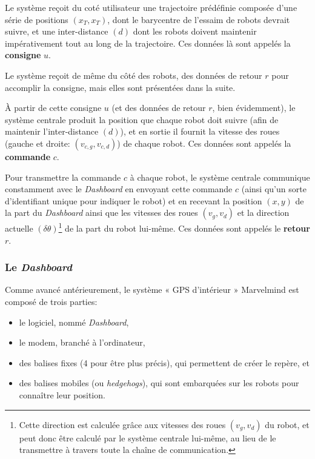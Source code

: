 Le système reçoit du coté utilisateur une trajectoire prédéfinie composée d'une série de positions $(x_T,x_T)$, dont le barycentre de l'essaim de robots devrait suivre, et une inter-distance $(d)$ dont les robots doivent maintenir impérativement tout au long de la trajectoire. Ces données là sont appelés la \textbf{consigne} $u$. 

\noindent Le système reçoit de même du côté des robots, des données de retour $r$ pour accomplir la consigne, mais elles sont présentées dans la suite. 

À partir de cette consigne $u$ (et des données de retour $r$, bien évidemment), le système centrale produit la position que chaque robot doit suivre (afin de maintenir l'inter-distance $(d)$), et en sortie il fournit la vitesse des roues (gauche et droite: $(v_{c,g}, v_{c,d})$) de chaque robot. Ces données sont appelés la \textbf{commande} $c$.

Pour transmettre la commande $c$ à chaque robot, le système centrale communique constamment avec le \textit{Dashboard} en envoyant cette commande $c$ (ainsi qu'un sorte d'identifiant unique pour indiquer le robot) et en recevant la position $(x, y)$ de la part du \textit{Dashboard} ainsi que les vitesses des roues $(v_g, v_d)$ et la direction actuelle $(\delta \theta)$\footnote{Cette direction est calculée grâce aux vitesses des roues $(v_g, v_d)$ du robot, et peut donc être calculé par le système centrale lui-même, au lieu de le transmettre à travers toute la chaîne de communication.} de la part du robot lui-même. Ces données sont appelés le \textbf{retour} $r$. 

\subsubsection{Le \textit{Dashboard}}
Comme avancé antérieurement, le système « GPS d’intérieur » Marvelmind est composé de trois parties: 
\begin{itemize}
    \item le logiciel, nommé \textit{Dashboard}, 
    \item le modem, branché à l'ordinateur,
    \item des balises fixes (4 pour être plus précis), qui permettent de créer le repère, et
    \item des balises mobiles (ou \textit{hedgehogs}), qui sont embarquées sur les robots pour connaître leur position.
\end{itemize}

